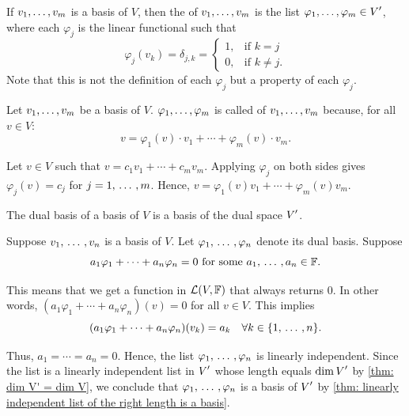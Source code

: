\begin{mydef}
  If $v_1, \dots, v_m$ is a basis of $V$, then the  of $v_1, \dots, v_m$ is the list $\varphi_1, \dots, \varphi_m \in \displaystyle V'$, where each $\varphi_j$ is the linear functional such that
  \begin{equation}
    \varphi_j(v_k) = \delta_{j,k} =
  \begin{cases}
    1,  & \text{if $k=j$} \\
    0, & \text{if $k \neq j$}.
  \end{cases}
  \end{equation}
  Note that this is not the definition of each $\varphi_j$ but a property of each $\varphi_j$.
\end{mydef}

\setcounter{thm}{113}
\begin{thm}
  Let $v_1, \dots, v_m$ be a basis of $V$. $\varphi_1, \dots, \varphi_m$ is called  of $v_1, \dots, v_m$ because, for all $v \in V$:
  \begin{equation}
    v=\varphi_1 (v)\cdot v_1 + \cdots + \varphi_m(v)\cdot v_m.
  \end{equation}
\end{thm}
\begin{prf}
  Let $v \in V$ such that $v= c_1v_1 + \cdots + c_mv_m$. Applying
  $\varphi_j$ on both sides gives $\varphi_j(v)=c_j$ for $j = 1, {\, \ldots \,\,}, m$. Hence,
  $v=\varphi_1 (v)v_1 + \cdots + \varphi_m(v)v_m$.
\end{prf}

\setcounter{thm}{115}
\begin{thm}
  The dual basis of a basis of $V$ is a basis of the dual space $\displaystyle V'$.
\end{thm}
\begin{prf}
  Suppose $v_1, {\, \ldots \,\,}, v_n$ is a basis of $V$. Let $\varphi_1, {\, \ldots \,\,}, \varphi_n$ denote its dual basis. Suppose
  \[
    a_1 \varphi_1 + \cdots + a_n \varphi_n = 0 \text{ for some } a_1, {\, \ldots \,\,}, a_n \in \mathbb{F}.
  \]

  This means that we get a function in $\mathcal{L}(V, \mathbb{F})$ that always returns $0$. In other words, $(a_1 \varphi_1 + \cdots + a_n \varphi_n)(v)=0$ for all $v \in V$. This implies
  \[
    (a_1 \varphi_1 + \cdots + a_n \varphi_n)(v_k)=a_k \quad \forall k \in \{1, {\, \ldots \,\,}, n\}.
  \]

  Thus, $a_1 = \cdots = a_n = 0$. Hence, the list $\varphi_1, {\, \ldots \,\,}, \varphi_n$ is linearly independent. Since the list is a linearly independent list in $\displaystyle V'$ whose length equals $\dim \displaystyle V'$ by \ref{thm: dim V' = dim V}, we conclude that $\varphi_1, {\, \ldots \,\,}, \varphi_n$ is a basis of $\displaystyle V'$ by \ref{thm: linearly independent list of the right length is a basis}.
\end{prf}

